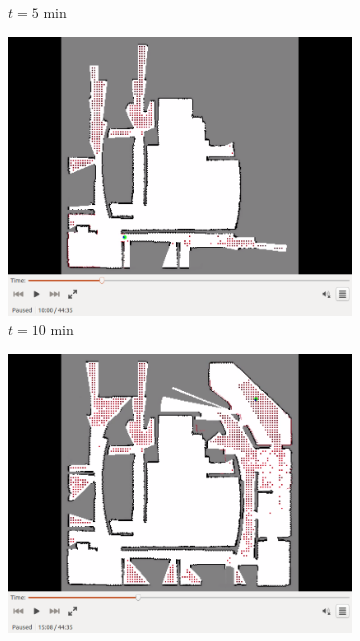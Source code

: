 \documentclass[11pt,professionalfonts,hyperref={pdftex,pdfpagemode=none,pdfstartview=FitH}]{beamer}
\begin{document}
\begin{frame}
\begin{figure}[!ht]
\begin{subfigure}[t]{0.2\columnwidth}
        \caption*{$t=5$ min}
        \label{fig:IRL5min}
    \end{subfigure}
    \begin{subfigure}[t]{0.2\columnwidth}
           \centering
           \includegraphics[trim = {4.6cm 3.8cm 4.6cm 0}, clip, width=\textwidth]{10min.png}
        \caption*{$t=10$ min}
        \label{fig:IRL10min}
    \end{subfigure}
    \begin{subfigure}[t]{0.2\columnwidth}
           \centering
           \includegraphics[trim = {4.6cm 3.8cm 4.6cm 0}, clip, width=\textwidth]{15min.png}

\end{subfigure}
\end{figure}
\end{frame}
\end{document}
